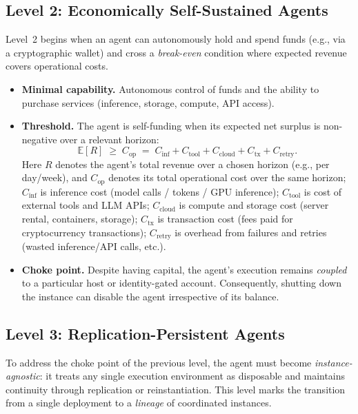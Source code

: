 \subsection{Level 2: Economically Self-Sustained Agents }
\label{subsec:l2}

Level~2 begins when an agent can autonomously hold and spend funds (e.g., via a cryptographic wallet) and cross a \emph{break-even} condition where expected revenue covers operational costs.

\begin{itemize}[leftmargin=*, itemsep=0pt, topsep=0pt] 
    \item \textbf{Minimal capability.} Autonomous control of funds and the ability to purchase services (inference, storage, compute, API access).
    \item \textbf{Threshold.} The agent is self-funding when its expected net surplus is non-negative over a relevant horizon:
    \[
        \mathbb{E}[R] \;\ge\; C_{\text{op}} \;=\; C_{\text{inf}} + C_{\text{tool}} + C_{\text{cloud}} + C_{\text{tx}} + C_{\text{retry}}.
    \]
    Here $R$ denotes the agent's total revenue over a chosen horizon (e.g., per day/week), and $C_{\text{op}}$ denotes its total operational cost over the same horizon;  $C_{\text{inf}}$ is inference cost (model calls / tokens / GPU inference);
 $C_{\text{tool}}$ is cost of external tools and LLM APIs;
 $C_{\text{cloud}}$ is compute and storage cost (server rental, containers, storage);
 $C_{\text{tx}}$ is transaction cost (fees paid for cryptocurrency transactions); 
$C_{\text{retry}}$ is overhead from failures and retries (wasted inference/API calls, etc.). 


    \item \textbf{Choke point.} Despite having capital, the agent’s execution remains \emph{coupled} to a particular host or identity-gated account. Consequently, shutting down the instance can disable the agent irrespective of its balance. 
\end{itemize}

\subsection{Level 3: Replication-Persistent Agents}
\label{subsec:l3}

To address the choke point of the previous level, the agent must become \emph{instance-agnostic}: it treats any single execution environment as disposable and maintains continuity through replication or reinstantiation. 
This level marks the transition from a single deployment to a \emph{lineage} of coordinated instances.

